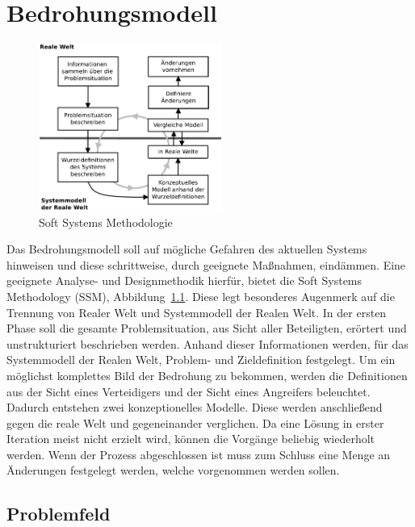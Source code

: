 \documentclass[11pt,a4paper]{report}
\begin{document}
\chapter{Bedrohungsmodell} \label{chap:threat}

\begin{figure}
\centering
\includegraphics[width=6cm]{images/ssm.pdf}
\caption{Soft Systems Methodologie}
\label{fig:ssm}
\end{figure}

Das Bedrohungsmodell soll auf mögliche Gefahren des aktuellen Systems hinweisen und diese schrittweise, durch geeignete Maßnahmen, eindämmen. Eine geeignete Analyse- und Designmethodik hierfür, bietet die Soft Systems Methodology (SSM), Abbildung~\ref{fig:ssm}. Diese legt besonderes Augenmerk auf die Trennung von Realer Welt und Systemmodell der Realen Welt. In der ersten Phase soll die gesamte Problemsituation, aus Sicht aller Beteiligten, erörtert und unstrukturiert beschrieben werden. Anhand dieser Informationen werden, für das Systemmodell der Realen Welt, Problem- und Zieldefinition festgelegt. Um ein möglichst komplettes Bild der Bedrohung zu bekommen, werden die Definitionen aus der Sicht eines Verteidigers und der Sicht eines Angreifers beleuchtet. Dadurch entstehen zwei konzeptionelles Modelle. Diese werden anschließend gegen die reale Welt und gegeneinander verglichen. Da eine Lösung in erster Iteration meist nicht erzielt wird, können die Vorgänge beliebig wiederholt werden. Wenn der Prozess abgeschlossen ist muss zum Schluss eine Menge an Änderungen festgelegt werden, welche vorgenommen werden sollen.

\section{Problemfeld} \label{sec:problemfeld}
\end{document}
